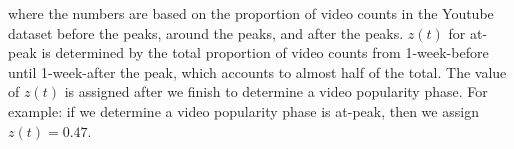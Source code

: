 \documentclass[10pt,final,journal,a4paper]{IEEEtran}
\begin{document}
where the numbers are based on the proportion of video counts in the Youtube dataset before the peaks, around the peaks, and after the peaks. 
$z(t)$ for at-peak is determined by the total proportion of video counts from 1-week-before until 1-week-after the peak, which accounts to almost half of the total.
The value of $z(t)$ is assigned after we finish to determine a video popularity phase.  
For example: if we determine a video popularity phase is at-peak, then we assign $z(t)=0.47$.
\end{document}
